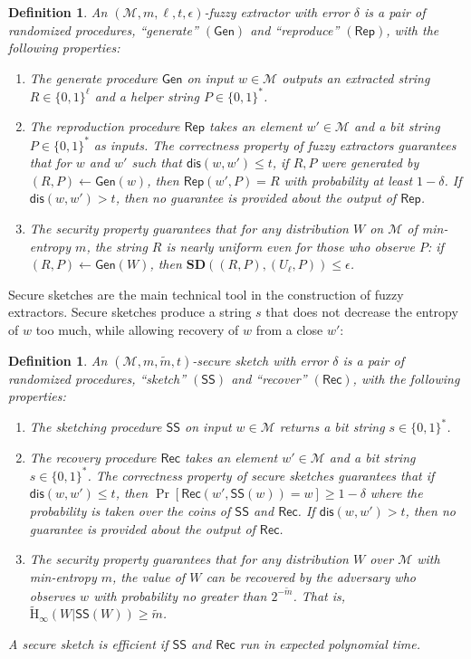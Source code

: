 \documentclass[11pt]{article}
\newcommand{\class}[1]{{\ensuremath{\mathsf{#1}}}}
\newcommand{\gen}{\ensuremath{\class{Gen}}\xspace}
\newcommand{\rep}{\ensuremath{\class{Rep}}\xspace}
\newcommand{\sketch}{\ensuremath{\class{SS}}\xspace}
\newcommand{\rec}{\ensuremath{\class{Rec}}\xspace}
\newcommand{\dis}{\ensuremath{\mathsf{dis}}}
\newcommand{\Hav}{\tilde{\mathrm{H}}_\infty}
\newtheorem{definition}[theorem]{Definition}
\begin{document}
\begin{definition}%
\label{def:fuzzy extractor}
An $(\mathcal{M}, m, \ell, t, \epsilon)$-\emph{fuzzy extractor} with error $\delta$ is a pair of randomized procedures, ``generate'' $(\gen)$ and ``reproduce'' $(\rep)$, with the following properties:
\begin{enumerate}
\item The generate procedure \gen on input $w\in \mathcal{M}$ outputs an extracted string $R\in\{0,1\}^\ell$ and a helper string $P\in\{0,1\}^*$.
\item The reproduction procedure \rep takes an element $w'\in \mathcal{M}$ and a bit string $P\in\{0,1\}^*$ as inputs.  The \emph{correctness} property of fuzzy extractors guarantees that for $w$ and $w'$ such that $\dis(w,w')\leq t$, if $R,P$ were generated by $(R,P)\leftarrow\gen(w)$, then $\rep(w',P)=R$ with probability at least $1-\delta$.  If $\dis(w,w')>t$, then no guarantee is provided about the output of \rep.
\item The \emph{security} property guarantees that for any distribution $W$ on $\mathcal{M}$ of min-entropy $m$, the string $R$ is nearly uniform even for those who observe $P$:  if $(R,P)\leftarrow\gen (W)$, then $\mathbf{SD}((R,P),(U_\ell,P))\leq \epsilon$.
\end{enumerate}
\end{definition}

Secure sketches are the main technical tool in the construction of fuzzy extractors.  Secure sketches produce a string $s$ that does not decrease the entropy of $w$ too much, while allowing recovery of $w$ from a  close $w'$:
\begin{definition}%
\label{def:secure sketch}
An $(\mathcal{M},m, \tilde{m}, t)$-\emph{secure sketch} with error $\delta$ is a pair of randomized procedures, ``sketch'' $(\sketch)$ and ``recover'' $(\rec)$, with the following properties:
\begin{enumerate}
\item The sketching procedure \sketch on input $w\in\mathcal{M}$ returns a bit string $s\in\{0,1\}^*$.
\item The recovery procedure \rec takes an element $w'\in\mathcal{M}$ and a bit string $s\in\{0,1\}^*$.  The \emph{correctness} property of secure sketches guarantees that if $\dis(w,w')\leq t$, then $\Pr[\rec(w',\sketch(w))=w]\geq 1-\delta$ where the probability is taken over the coins of $\sketch$ and $\rec$.  If $\dis(w,w')>t$, then no guarantee is provided about the output of \rec.
\item The \emph{security} property guarantees that for any distribution $W$ over $\mathcal{M}$ with min-entropy $m$, the value of $W$ can be recovered by the adversary who observes $w$ with probability no greater than $2^{-\tilde{m}}$.  That is, $\Hav(W|\sketch(W))\geq \tilde{m}$.
\end{enumerate}
A secure sketch is \emph{efficient} if \sketch and \rec run in expected polynomial time. 
\end{definition}
\end{document}
